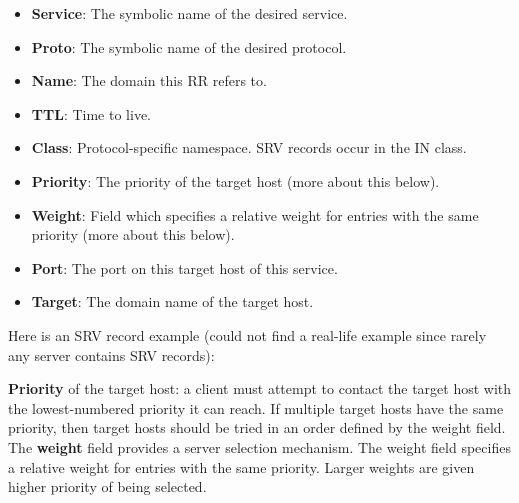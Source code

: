 \documentclass[a4paper]{article}
\begin{document}
\begin{enumerate}[label=(\alph*)]
\begin{itemize}
        \item \textbf{Service}: The symbolic name of the desired service.
        \item \textbf{Proto}: The symbolic name of the desired protocol. 
        \item \textbf{Name}: The domain this RR refers to.
        \item \textbf{TTL}: Time to live.
        \item \textbf{Class}: Protocol-specific namespace. SRV records occur in the IN class.
        \item \textbf{Priority}: The priority of the target host (more about this below).
        \item \textbf{Weight}: Field which specifies a relative weight for entries with the same priority (more about this below).
        \item \textbf{Port}: The port on this target host of this service.
        \item \textbf{Target}: The domain name of the target host.
    \end{itemize}
    Here is an SRV record example (could not find a real-life example since rarely any server contains SRV records):
    
    \textbf{Priority} of the target host: a client must attempt to contact the target host with the lowest-numbered priority it can reach. If multiple target hosts have the same priority, then target hosts should be tried in an order defined by the weight field. The \textbf{weight} field provides a server selection mechanism. The weight field specifies a relative weight for entries with the same priority. Larger weights are given higher priority of being selected. 
    

\end{enumerate}
\end{document}
